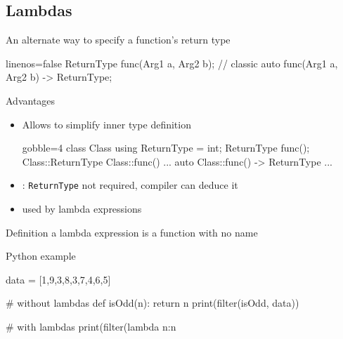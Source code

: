 \subsection[$\lambda$]{Lambdas}

\begin{frame}[fragile]
  \begin{block}{An alternate way to specify a function's return type}
    \begin{cppcode*}{linenos=false}
      ReturnType func(Arg1 a, Arg2 b);  // classic
      auto func(Arg1 a, Arg2 b) -> ReturnType;
    \end{cppcode*}
  \end{block}
  \pause
  \begin{block}{Advantages}
    \begin{itemize}
    \item Allows to simplify inner type definition
      \begin{cppcode*}{gobble=4}
        class Class {
          using ReturnType = int;
          ReturnType func();
        }
        Class::ReturnType Class::func() {...}
        auto Class::func() -> ReturnType {...}
      \end{cppcode*}
    \item {}: \texttt{ReturnType} not required, compiler can deduce it
    \item used by lambda expressions
    \end{itemize}
  \end{block}
\end{frame}


\begin{frame}[fragile]
  \begin{block}{Definition}
    a lambda expression is a function with no name
  \end{block}
  \pause
  \begin{exampleblock}{Python example}
    \begin{pythoncode*}{}
      data = [1,9,3,8,3,7,4,6,5]

      # without lambdas
      def isOdd(n):
        return n%
      print(filter(isOdd, data))

      # with lambdas
      print(filter(lambda n:n%
    \end{pythoncode*}
  \end{exampleblock}
\end{frame}


